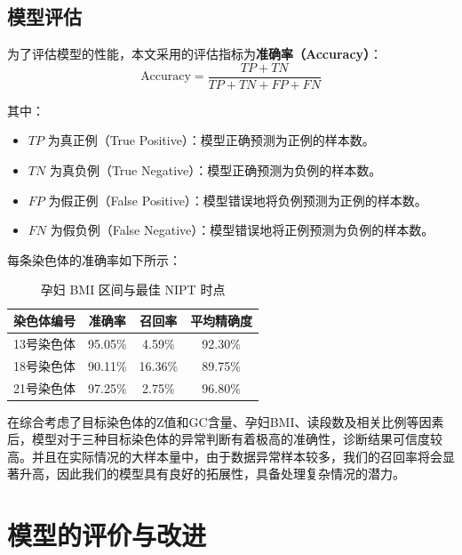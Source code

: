 \documentclass[12pt]{ctexart}
\begin{document}
	\subsection{模型评估}
	
	为了评估模型的性能，本文采用的评估指标为\textbf{准确率（Accuracy）}：
	\begin{equation}
	\text{Accuracy} = \frac{TP + TN}{TP + TN + FP + FN}
	\end{equation}
	
	其中：
	\begin{itemize}[noitemsep, topsep=0pt, parsep=0pt, partopsep=0pt, leftmargin=1.5em]
		\item \( TP \) 为真正例（True Positive）：模型正确预测为正例的样本数。
		\item \( TN \) 为真负例（True Negative）：模型正确预测为负例的样本数。
		\item \( FP \) 为假正例（False Positive）：模型错误地将负例预测为正例的样本数。
		\item \( FN \) 为假负例（False Negative）：模型错误地将正例预测为负例的样本数。
	\end{itemize}
		
	
	每条染色体的准确率如下所示：
\begin{table}[htbp]
	\centering
	\caption{孕妇 BMI 区间与最佳 NIPT 时点}
	\begin{threeparttable}
		\setlength{\tabcolsep}{12pt} %
		\begin{tabular}{cccc}
			\toprule
			\textbf{染色体编号} & \textbf{准确率} & \textbf{召回率} & \textbf{平均精确度} \\
			\midrule
			13号染色体 & 95.05\% & 4.59\% & 92.30\% \\
			18号染色体 & 90.11\% & 16.36\% & 89.75\% \\
			21号染色体 & 97.25\% & 2.75\% & 96.80\% \\
			\bottomrule
		\end{tabular}
	\end{threeparttable}
\end{table}
	
	在综合考虑了目标染色体的Z值和GC含量、孕妇BMI、读段数及相关比例等因素后，模型对于三种目标染色体的异常判断有着极高的准确性，诊断结果可信度较高。并且在实际情况的大样本量中，由于数据异常样本较多，我们的召回率将会显著升高，因此我们的模型具有良好的拓展性，具备处理复杂情况的潜力。
	
	\section{模型的评价与改进}
\end{document}
